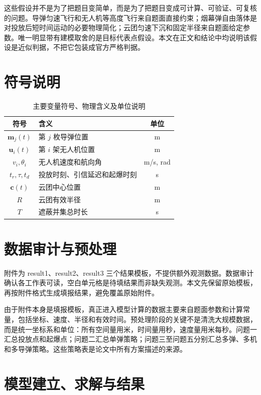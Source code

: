 \documentclass[UTF8,12pt,a4paper]{ctexart}
\begin{document}
这些假设并不是为了把题目变简单，而是为了把题目变成可计算、可验证、可复核的问题。导弹匀速飞行和无人机等高度飞行来自题面直接约束；烟幕弹自由落体是对投放后短时间运动的必要物理简化；云团匀速下沉和固定半径来自题面给定参数。唯一明显带有建模取舍的是目标代表点假设。本文在正文和结论中均说明该假设是近似判据，不把它包装成官方严格判据。

\section{符号说明}

\begin{table}[H]
\centering
\caption{主要变量符号、物理含义及单位说明}
\begin{tabularx}{\textwidth}{CLC}
\toprule
符号 & 含义 & 单位 \\
\midrule
\(\bm m_j(t)\) & 第 \(j\) 枚导弹位置 & m \\
\(\bm u_i(t)\) & 第 \(i\) 架无人机位置 & m \\
\(v_i,\theta_i\) & 无人机速度和航向角 & m/s, rad \\
\(t_r,\tau,t_d\) & 投放时刻、引信延迟和起爆时刻 & s \\
\(\bm c(t)\) & 云团中心位置 & m \\
\(R\) & 云团有效半径 & m \\
\(T\) & 遮蔽并集总时长 & s \\
\bottomrule
\end{tabularx}
\end{table}

\section{数据审计与预处理}

附件为 result1、result2、result3 三个结果模板，不提供额外观测数据。数据审计确认各工作表可读，空白单元格是待填结果而非缺失观测。本文先保留原始模板，再按附件格式生成填报结果，避免覆盖原始附件。

由于附件本身是填报模板，真正进入模型计算的数据主要来自题面参数和计算常量，包括坐标、速度、半径和有效时间。预处理阶段的关键不是清洗大规模数据，而是统一坐标系和单位：所有空间量用米，时间量用秒，速度量用米每秒。问题一汇总投放点和起爆点；问题二汇总单弹策略；问题三至问题五分别汇总多弹、多机和多导弹策略。这些策略表是论文中所有方案描述的来源。

\section{模型建立、求解与结果}
\end{document}
